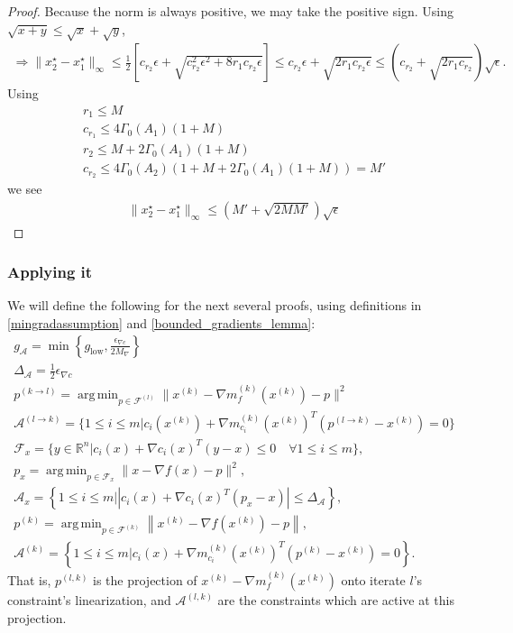 \documentclass{article}
\theoremstyle{case}
\numberwithin{theorem}{subsection}
\DeclareMathOperator*{\argmin}{arg\,min}
\newcommand{\feasiblek}{{\mathcal F^{(k)}}}
\newcommand{\gk}{{\nabla m_f^{(k)}(x^{(k)})}}
\newcommand{\gmcik}{{\nabla m_{c_i}^{(k)}\left(\xk\right)}}
\newcommand{\gradf}{\nabla f}
\newcommand{\huff}{{\Gamma_0}}
\newcommand{\maxgrad}{{M_{\nabla}}}
\newcommand{\minactivegraddelta}{{\Delta_{\mathcal A}}}
\newcommand{\minactivegrad}{{ g_{\mathcal A} }}
\newcommand{\mingradepsilon}{{\epsilon_{\nabla c}}}
\newcommand{\mingrad}{{ g_{\textrm{low}} }}
\newcommand{\Rn}{\mathbb R^n}
\newcommand{\xk}{{x^{(k)}}}
\begin{document}
\begin{proof}
Because the norm is always positive, we may take the positive sign.
Using $\sqrt{x + y} \le \sqrt{x} + \sqrt{y}$,
\begin{align*}
\Longrightarrow \|x_2^{\star} - x_1^{\star}\|_{\infty} \le \frac 1 2 \left[c_{r_2}\epsilon + \sqrt{c_{r_2}^2\epsilon^2 + 8r_1c_{r_2}\epsilon}\right] 
\le c_{r_2}\epsilon + \sqrt{2r_1c_{r_2}\epsilon}
\le \left(c_{r_2} + \sqrt{2r_1c_{r_2}}\right)\sqrt{\epsilon}.
\end{align*}
Using 
\begin{align*}
r_1 \le M \\
c_{r_1} \le 4\huff(A_1)\left(1 + M\right) \\
r_2 \le  M + 2\huff(A_1)\left(1 + M\right) \\
c_{r_2} \le  4\huff(A_2)\left(1 + M + 2\huff(A_1)\left(1 + M\right)\right) = M'
\end{align*}
we see
\begin{align*}
\|x_2^{\star} - x_1^{\star}\|_{\infty} \le \left( M' + \sqrt{2MM'}\right)\sqrt{\epsilon}
\end{align*}

\end{proof}


\subsubsection{Applying it}
\color{red}
We will define the following for the next several proofs, using definitions in \cref{mingradassumption} and \cref{bounded_gradients_lemma}:
\begin{align}
\minactivegrad = \min\left\{\mingrad, \frac {\mingradepsilon} {2 \maxgrad}  \right\} \label{define_minactivegrad} \\
\minactivegraddelta = \frac 1 2 \mingradepsilon \label{define_minactivedelta} \\
p^{(k \to l)} = \argmin_{p \in \mathcal F^{(l)}} \|\xk - \gk - p\|^2 \label{bp_define_plk} \\
\mathcal A^{(l \to k)} = \{1 \le i \le m | c_i(\xk) + \gmcik^T(p^{(l\to k)} - \xk) = 0 \} \label{bp_define_activep} \\
\mathcal F_x = \{ y \in \Rn | c_i(x) + \nabla c_i(x)^T(y - x) \le 0 \quad \forall 1 \le i \le m\}, \label{bp_define_true_linearization} \\
p_x = \argmin_{p \in \mathcal F_x} \|x - \gradf(x) - p\|^2, \label{bp_define_true_projection} \\
\mathcal A_x = \left\{1 \le i \le m | \left|c_i(x) + \nabla c_i(x)^T(p_x - x)\right| \le \minactivegraddelta \right\}, \label{define_projection_active} \\
p^{(k)} = \argmin_{p \in \feasiblek} \left\| \xk - \nabla f\left(\xk\right) - p \right\|, \label{bp_define_pl} \\
\mathcal A^{(k)} = \left\{1 \le i \le m | c_i(x) + \gmcik^T\left(p^{(k)} - \xk\right) = 0 \right\}. \label{bp_define_yet_another_thing}
\end{align}
That is, $p^{(l, k)}$ is the projection of $\xk - \gk$ onto iterate $l$'s constraint's linearization,
and $\mathcal A^{(l, k)}$ are the constraints which are active at this projection.
\end{document}

